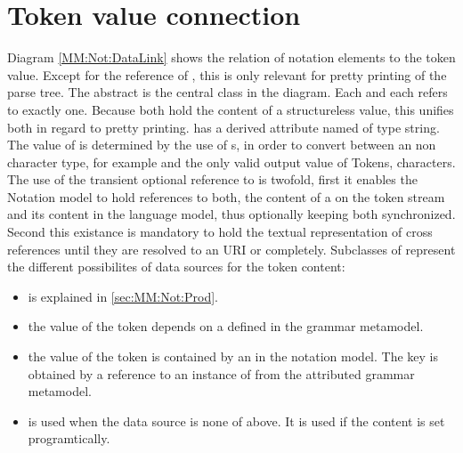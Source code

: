 \section{Token value connection}
Diagram \ref{MM:Not:DataLink} shows the relation of notation elements to the token value. Except for the  reference of , this is only relevant for pretty printing of the parse tree. The abstract  is the central class in the diagram. Each  and each  refers to exactly one. Because both hold the content of a structureless value, this unifies both in regard to pretty printing.  has a derived attribute named  of type string. The value of  is determined by the use of s, in order to convert between an non character type, for example  and the only valid output value of Tokens, characters. The use of the transient optional reference to  is twofold, first it enables the Notation model to hold references to both, the content of a  on the token stream and its content in the language model, thus optionally keeping both synchronized. Second this existance is mandatory to hold the textual representation of cross references until they are resolved to an URI or completely. Subclasses of  represent the different possibilites of data sources for the token content:
\begin{itemize}
	\item {} is explained in \ref{sec:MM:Not:Prod}.
	\item {} the value of the token depends on a   defined in the grammar metamodel.
	\item {} the value of the token is contained by an  in the notation model. The key is obtained by a reference to an instance of  from the  attributed grammar metamodel.
	\item {} is used when the data source is none of above. It is used if the content is set programtically.
\end{itemize}


